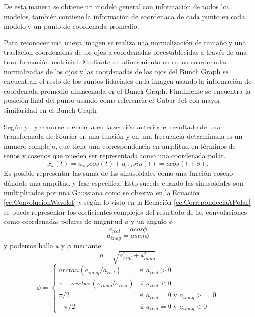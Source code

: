 De esta manera se obtiene un modelo general con información de todos los modelos, también contiene la información de coordenada de cada punto en cada modelo y un punto de coordenada promedio.

Para reconocer una nueva imagen se realiza una normalización de tamaño y una traslación coordenadas de los ojos a coordenadas preestablecidas a través de una transformación matricial. Mediante un alineamiento entre las coordenadas normalizadas de los ojos y las coordenadas de los ojos del Bunch Graph se encuentran el resto de los puntos fiduciales en la imagen usando la información de coordenada promedio almacenada en el Bunch Graph. Finalmente se encuentra la posición final del punto usando como referencia el Gabor Jet con mayor similaridad en el Bunch Graph

Según \cite{bolme2003elastic} y \cite{wiskott1997face}, y como se menciona en la sección anterior el resultado de una transformada de Fourier en una función y en una frecuencia determinada es un numero complejo, que tiene una correspondencia en amplitud en términos de senos y cosenos que pueden ser representada como una coordenada polar.
\begin{equation}
x_{\omega}(t)=a_{\omega,r}cos(t)+a_{\omega,i}sin(t)= a cos(t+\phi).
\label{ec:CorrepondeciaAPolar}
\end{equation}
Es posible representar las suma de las sinusoidales como una función coseno dándole una amplitud y fase especifica.
Esto sucede cuando las sinusoidales son multiplicadas por una Gaussiana como se observa en la Ecuación \ref{ec:ConvolucionWavelet} y según lo visto en la Ecuación \ref{ec:CorrepondeciaAPolar} se puede representar los coeficientes complejos del resultado de las convoluciones como coordenadas polares de magnitud $a$ y un angulo $\phi$
\begin{equation}
a_{real} = a cos\phi 
\end{equation}
\begin{equation}
 a_{imag} = a sen\phi 
\end{equation}
y podemos halla $a$ y $\phi$ mediante:
\begin{equation}
a = \sqrt{a^2_{real}+a^2_{imag}}
\end{equation}
\begin{equation}
\phi=\left\{\begin{matrix}
arctan(a_{imag}/a_{real}) & \textrm{si } a_{real}>0 \\ 
\pi+arctan(a_{imag}/a_{real}) & \textrm{si } a_{real}<0 \\ 
\pi/2 & \textrm{si } a_{real}=0 \textrm{ y } a_{imag}>= 0 \\ 
-\pi/2 & \textrm{si } a_{real}=0 \textrm{ y } a_{imag}<0
\end{matrix}\right.
\end{equation}
